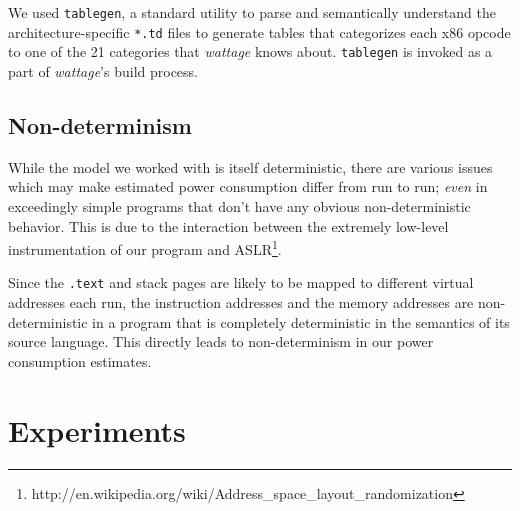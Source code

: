 We used \texttt{tablegen}, a standard utility to parse and
semantically understand the architecture-specific \texttt{*.td} files
to generate tables that categorizes each x86 opcode to one of the 21
categories that \textit{wattage} knows about.  \texttt{tablegen} is
invoked as a part of \textit{wattage}'s build process.

\subsection{Non-determinism}

While the model we worked with is itself deterministic, there are
various issues which may make estimated power consumption differ from
run to run; \textit{even} in exceedingly simple programs that don't
have any obvious non-deterministic behavior.  This is due to the
interaction between the extremely low-level instrumentation of our
program and
ASLR\footnote{http://en.wikipedia.org/wiki/Address\_space\_layout\_randomization}.

Since the \texttt{.text} and stack pages are likely to be mapped to
different virtual addresses each run, the instruction addresses and
the memory addresses are non-deterministic in a program that is
completely deterministic in the semantics of its source language.
This directly leads to non-determinism in our power consumption
estimates.

\section{Experiments}


